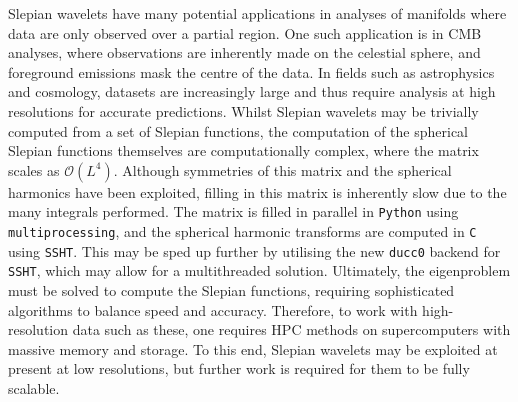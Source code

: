 Slepian wavelets have many potential applications in analyses of manifolds where data are only observed over a partial region.
One such application is in CMB analyses, where observations are inherently made on the celestial sphere, and foreground emissions mask the centre of the data.
In fields such as astrophysics and cosmology, datasets are increasingly large and thus require analysis at high resolutions for accurate predictions.
Whilst Slepian wavelets may be trivially computed from a set of Slepian functions, the computation of the spherical Slepian functions themselves are computationally complex, where the matrix scales as \(\mathcal{O}(L^{4})\).
Although symmetries of this matrix and the spherical harmonics have been exploited, filling in this matrix is inherently slow due to the many integrals performed.
The matrix is filled in parallel in \texttt{Python} using \texttt{multiprocessing}, and the spherical harmonic transforms are computed in \texttt{C} using \texttt{SSHT}.
This may be sped up further by utilising the new \texttt{ducc0} backend for \texttt{SSHT}, which may allow for a multithreaded solution.
Ultimately, the eigenproblem must be solved to compute the Slepian functions, requiring sophisticated algorithms to balance speed and accuracy.
Therefore, to work with high-resolution data such as these, one requires HPC methods on supercomputers with massive memory and storage.
To this end, Slepian wavelets may be exploited at present at low resolutions, but further work is required for them to be fully scalable.
